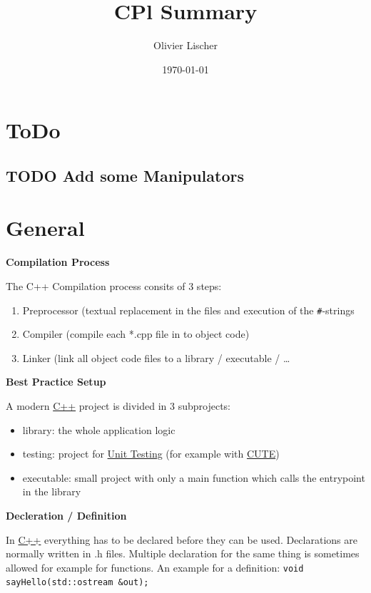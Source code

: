 \documentclass[11pt,twoside,landscape]{article}
\author{Olivier Lischer}
\date{\today}
\title{CPl Summary}
\begin{document}
\pagestyle{fancy}
\fancyhf{}
\fancyfoot[CE,CO]{\leftmark}
\fancyfoot[R]{\thepage}
\begin{multicols}{3}

\section{ToDo}
\label{sec:org2beb7c2}
\subsection{{\bfseries\sffamily TODO} Add some Manipulators}
\label{sec:org389a6ba}

\section{General}
\label{sec:org2788196}
\textbf{Compilation Process}

The C++ Compilation process consits of 3 steps:
\begin{enumerate}
\item Preprocessor (textual replacement in the files and execution of the \texttt{\#}-strings
\item Compiler (compile each *.cpp file in to object code)
\item Linker (link all object code files to a library / executable / \ldots{}
\end{enumerate}


\textbf{Best Practice Setup}

A modern \href{../../../roam/20210920103243-c.org}{C++} project is divided in 3 subprojects:
\begin{itemize}
\item library: the whole application logic
\item testing: project for \href{../../../roam/20210920103754-unit_testing.org}{Unit Testing} (for example with \href{../../../roam/20210920103820-cute.org}{CUTE})
\item executable: small project with only a main function which calls the entrypoint in the library
\end{itemize}


\textbf{Decleration / Definition}

In \href{../../../roam/20210920103243-c.org}{C++} everything has to be declared before they can be used.
Declarations are normally written in .h files.
Multiple declaration for the same thing is sometimes allowed for example for functions.
An example for a definition: \texttt{void sayHello(std::ostream \&out);}


\end{multicols}
\end{document}
